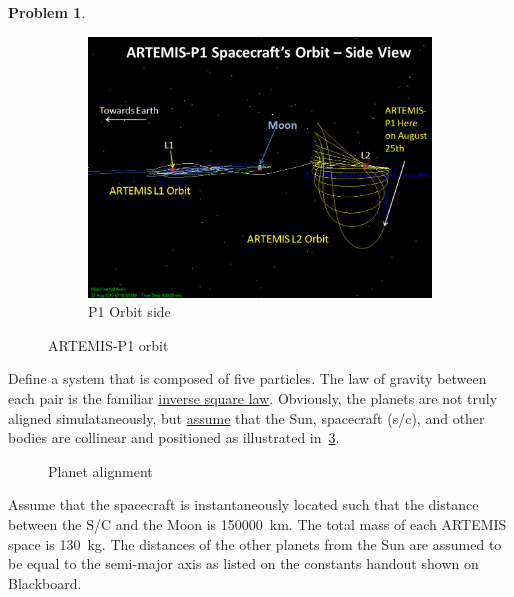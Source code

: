 \documentclass[10pt]{article}
\theoremstyle{definition}
\newtheorem{prob}{Problem}[section]
\begin{document}
\begin{prob}
\begin{figure}[htbp]
\begin{subfigure}[htbp]{0.5\textwidth}
            \includegraphics[width=\textwidth, keepaspectratio]{figures/artemis_side.jpg} 
            \caption{P1 Orbit side \label{fig:side_view}} 
        \end{subfigure} 
        \caption{ARTEMIS-P1 orbit~\label{fig:artemis}}
    \end{figure}
    
    Define a system that is composed of five particles.
    The law of gravity between each pair is the familiar \underline{inverse square law}.
    Obviously, the planets are not truly aligned simulataneously, but \underline{assume} that the Sun, spacecraft (s/c), and other bodies are collinear and positioned as illustrated in~\cref{fig:planets}.
    \begin{figure}[htbp]
        \centering
        \caption{Planet alignment~\label{fig:planets}}
    \end{figure}
    Assume that the spacecraft is instantaneously located such that the distance between the S/C and the Moon is \SI{150000}{\kilo\meter}.
    The total mass of each ARTEMIS space is \SI{130}{\kilo\gram}.
    The distances of the other planets from the Sun are assumed to be equal to the semi-major axis as listed on the constants handout shown on Blackboard.


\end{prob}
\end{document}
